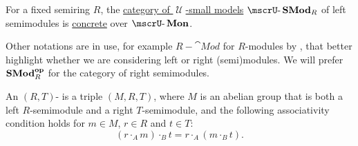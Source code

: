 \begin{definition}
\begin{thmenum}[resume=def:semimodule]
    \mimprovised For a fixed semiring \( R \), the \hyperref[def:category_of_small_first_order_models]{category of \( \mscrU \)-small models} \( \ucat{SMod}_R \) of left semimodules is \hyperref[def:concrete_category]{concrete} over \hyperref[def:monoid]{\( \ucat{Mon} \)}.

    Other notations are in use, for example \( R-\cat{Mod} \) for \( R \)-modules by , that better highlight whether we are considering left or right (semi)modules. We will prefer \( \cat{SMod}_R^\oppos \) for the category of right semimodules.

     An \( (R, T) \)- is a triple \( (M, R, T) \), where \( M \) is an abelian group that is both a left \( R \)-semimodule and a right \( T \)-semimodule, and the following associativity condition holds for \( m \in M \), \( r \in R \) and \( t \in T \):
    \begin{equation}\label{eq:def:semimodule/bisemimodule/associativity}
      (r \cdot_A m) \cdot_B t = r \cdot_A (m \cdot_B t).
    \end{equation}
  \end{thmenum}
\end{definition}
